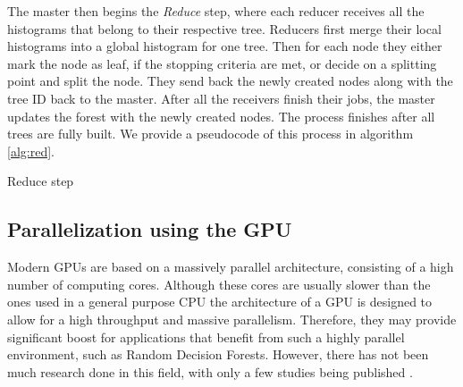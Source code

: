 \documentclass[thesis=B,english]{FITthesis}[2012/10/20]
\begin{document}
	The master then begins the \emph{Reduce} step, where each reducer receives all the histograms that belong to their respective tree. Reducers first merge their local histograms into a global histogram for one tree. Then for each node they either mark the node as leaf, if the stopping criteria are met, or decide on a splitting point and split the node. They send back the newly created nodes along with the tree ID back to the master. After all the receivers finish their jobs, the master updates the forest with the newly created nodes. The process finishes after all trees are fully built. We provide a pseudocode of this process in algorithm \ref{alg:red}.

	\begin{algorithm}[H]
	\caption{Reduce step}
	\label{alg:red}

	\end{algorithm} 

	\subsection{Parallelization using the GPU}
	\label{sec:rdf_gpu}
	Modern GPUs are based on a massively parallel architecture, consisting of a high number of computing cores. Although these cores are usually slower than the ones used in a general purpose CPU the architecture of a GPU is designed to allow for a high throughput and massive parallelism. Therefore, they may provide significant boost for applications that benefit from such a highly parallel environment, such as Random Decision Forests. However, there has not been much research done in this field, with only a few studies being published \cite{sharp2008implementing,grahn2011cudarf, liao2013learning}.
	
\end{document}

